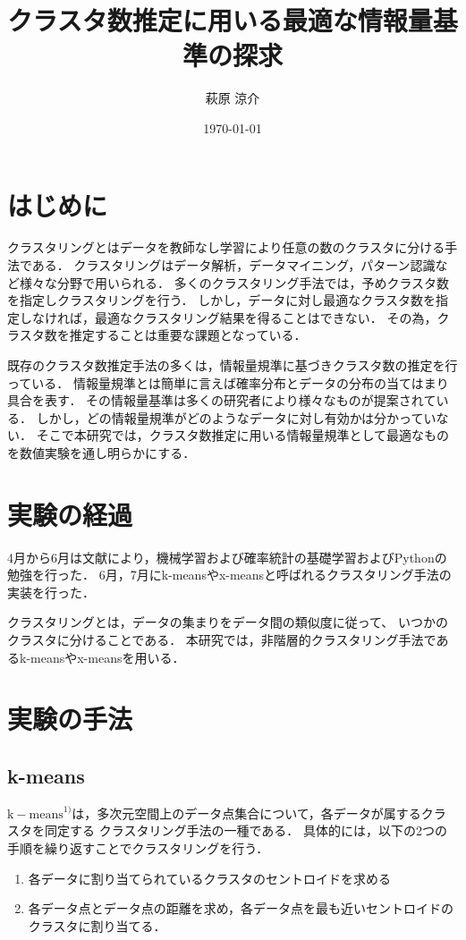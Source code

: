 \documentclass[10pt,a4j,twocolumn]{ltjsarticle}
\author{萩原 涼介}
\title{クラスタ数推定に用いる最適な情報量基準の探求}
\date{\today}
\begin{document}
\maketitle
\section{はじめに}
クラスタリングとはデータを教師なし学習により任意の数のクラスタに分ける手法である．
クラスタリングはデータ解析，データマイニング，パターン認識など様々な分野で用いられる．
多くのクラスタリング手法では，予めクラスタ数を指定しクラスタリングを行う．
しかし，データに対し最適なクラスタ数を指定しなければ，最適なクラスタリング結果を得ることはできない．
その為，クラスタ数を推定することは重要な課題となっている．

既存のクラスタ数推定手法の多くは，情報量規準に基づきクラスタ数の推定を行っている．
情報量規準とは簡単に言えば確率分布とデータの分布の当てはまり具合を表す．
その情報量基準は多くの研究者により様々なものが提案されている．
しかし，どの情報量規準がどのようなデータに対し有効かは分かっていない．
そこで本研究では，クラスタ数推定に用いる情報量規準として最適なものを数値実験を通し明らかにする．

\section{実験の経過}
4月から6月は文献により，機械学習および確率統計の基礎学習およびPythonの勉強を行った．
6月，7月にk-meansやx-meansと呼ばれるクラスタリング手法の実装を行った．

クラスタリングとは，データの集まりをデータ間の類似度に従って、
いつかのクラスタに分けることである．
本研究では，非階層的クラスタリング手法であるk-meansやx-meansを用いる．

\section{実験の手法}
\subsection{k-means}
$\mathrm{k-means}^{1)}$は，多次元空間上のデータ点集合について，各データが属するクラスタを同定する
クラスタリング手法の一種である．
具体的には，以下の2つの手順を繰り返すことでクラスタリングを行う．
\begin{enumerate}
  \item 各データに割り当てられているクラスタのセントロイドを求める
  \item 各データ点とデータ点の距離を求め，各データ点を最も近いセントロイドのクラスタに割り当てる．
\end{enumerate}
\end{document}
